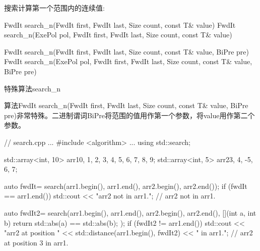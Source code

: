 搜索计算第一个范围内的连续值:

\begin{cpp}
FwdIt search_n(FwdIt first, FwdIt last, Size count, const T& value)
FwdIt search_n(ExePol pol, FwdIt first, FwdIt last, Size count, const T& value)

FwdIt search_n(FwdIt first, FwdIt last, Size count, const T& value, BiPre pre)
FwdIt search_n(ExePol pol, FwdIt first,
			   FwdIt last, Size count, const T& value, BiPre pre)
\end{cpp}

\begin{myWarning}{特殊算法search\_n}
	
算法FwdIt search\_n(FwdIt first, FwdIt last, Size count, const T\& value, BiPre pre)非常特殊。二进制谓词BiPre将范围的值用作第一个参数，将value用作第二个参数。
\end{myWarning}


\begin{cpp}
// search.cpp
...
#include <algorithm>
...
using std::search;

std::array<int, 10> arr1{0, 1, 2, 3, 4, 5, 6, 7, 8, 9};
std::array<int, 5> arr2{3, 4, -5, 6, 7};

auto fwdIt= search(arr1.begin(), arr1.end(), arr2.begin(), arr2.end());
if (fwdIt == arr1.end()) std::cout << "arr2 not in arr1."; // arr2 not in arr1.

auto fwdIt2= search(arr1.begin(), arr1.end(), arr2.begin(), arr2.end(),
					[](int a, int b){ return std::abs(a) == std::abs(b); });
if (fwdIt2 != arr1.end()) std::cout << "arr2 at position "
					<< std::distance(arr1.begin(), fwdIt2) << " in arr1.";
													// arr2 at position 3 in arr1.
\end{cpp}









